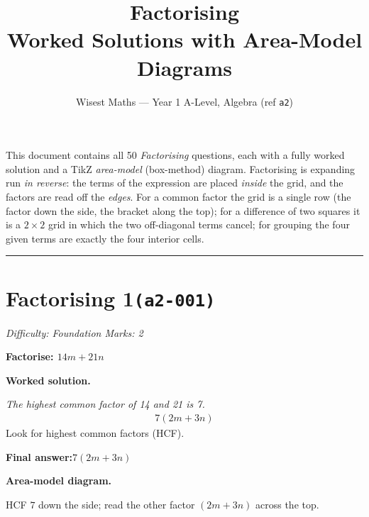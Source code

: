 \documentclass[11pt]{article}
\title{\textbf{Factorising}\\[0.3em]\large Worked Solutions with Area-Model Diagrams}
\author{Wisest Maths --- Year 1 A-Level, Algebra (ref \texttt{a2})}
\date{}
\newcommand{\question}[1]{\par\medskip\noindent\textbf{#1}\par}
\begin{document}
\maketitle
\noindent This document contains all 50 \emph{Factorising} questions, each with a fully worked
solution and a TikZ \emph{area-model} (box-method) diagram. Factorising is expanding run \emph{in reverse}:
the terms of the expression are placed \emph{inside} the grid, and the factors are read off the
\emph{edges}. For a common factor the grid is a single row (the factor down the side, the bracket along
the top); for a difference of two squares it is a $2\times2$ grid in which the two off-diagonal terms
cancel; for grouping the four given terms are exactly the four interior cells.
\tableofcontents
\bigskip
\hrule

\section*{Factorising 1\quad\small\texttt{(a2-001)}}
\textit{Difficulty: Foundation \quad\textbar\quad Marks: 2}

\question{Factorise: \( 14m +21n \)}

\textbf{Worked solution.}

\textit{The highest common factor of 14 and 21 is 7.}
\[\begin{gathered}
7(2m+3n)
\end{gathered}\]
Look for highest common factors (HCF).

\begin{answerbox}
\textbf{Final answer:}\quad \(\displaystyle 7(2m+3n)\)
\end{answerbox}
\textbf{Area-model diagram.}

\begin{center}
\end{center}
\small HCF $7$ down the side; read the other factor $(2m+3n)$ across the top.\normalsize
\end{document}
